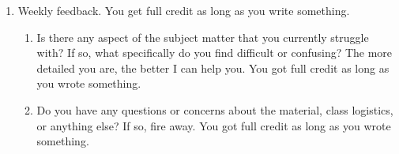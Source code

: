 \documentclass{article}\usepackage{graphicx, color}
\numberwithin{equation}{section}
\begin{document}
\begin{flushleft}
\begin{enumerate}[1. ]
\item Weekly feedback. You get full credit as long as you write something.
\begin{enumerate}[1. ]
\item Is there any aspect of the subject matter that you currently struggle with? If so, what specifically do you find difficult or confusing? The more detailed you are, the better I can help you.
{\color{red} You got full credit as long as you wrote something.}
\item Do you have any questions or concerns about the material, class logistics, or anything else? If so, fire away.
{\color{red} You got full credit as long as you wrote something.}
\end{enumerate}

\end{enumerate}




\end{flushleft}
% 
%
\end{document}
